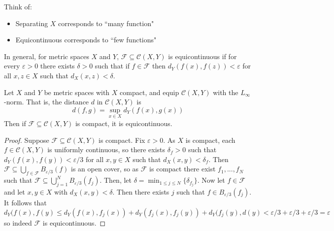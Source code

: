 \begin{remark}
    Think of: \begin{itemize}
        \item Separating $X$ corresponds to ``many function"
        \item Equicontinuous corresponds to ``few functions"
    \end{itemize}
\end{remark}

\begin{definition}
    In general, for metric spaces $X$ and $Y$, $\mathcal{F} \subseteq \mathcal{C}(X,Y)$ is equicontinuous if for every $\varepsilon > 0$ there exists $\delta > 0$ such that if $f \in \mathcal{F}$ then $d_Y(f(x),f(z)) < \varepsilon$ for all $x,z \in X$ such that $d_X(x,z) < \delta$.
\end{definition}

\begin{proposition}
    Let $X$ and $Y$ be metric spaces with $X$ compact, and equip $\mathcal{C}(X,Y)$ with the $L_{\infty}$-norm. That is, the distance $d$ in $\mathcal{C}(X,Y)$ is $$d(f,g) = \sup_{x\in X}d_Y(f(x),g(x))$$ Then if $\mathcal{F}\subseteq \mathcal{C}(X,Y)$ is compact, it is equicontinuous.
\end{proposition}
\begin{proof}
    Suppose $\mathcal{F} \subseteq \mathcal{C}(X,Y)$ is compact. Fix $\varepsilon > 0$. As $X$ is compact, each $f \in \mathcal{C}(X,Y)$ is uniformly continuous, so there exists $\delta_f > 0$ such that $d_Y(f(x),f(y)) < \varepsilon/3$ for all $x,y \in X$ such that $d_X(x,y) < \delta_f$. Then $\mathcal{F} \subseteq \bigcup_{f \in \mathcal{F}}B_{\varepsilon/3}(f)$ is an open cover, so as $\mathcal{F}$ is compact there exist $f_1,...,f_N$ such that $\mathcal{F} \subseteq \bigcup_{j=1}^NB_{\varepsilon/3}(f_j)$. Then, let $\delta = \min_{1\leq j \leq N}\{\delta_{f_j}\}$. Now let $f \in \mathcal{F}$ and let $x,y \in X$ with $d_X(x,y) < \delta$. Then there exists $j$ such that $f \in B_{\varepsilon/3}(f_j)$. It follows that $$d_Y(f(x),f(y) \leq d_Y(f(x),f_j(x))+d_Y(f_j(x),f_j(y)) + d_Y(f_j(y),d(y) < \varepsilon/3 + \varepsilon/3+\varepsilon/3 = \varepsilon$$ so indeed $\mathcal{F}$ is equicontinuous.
\end{proof}

